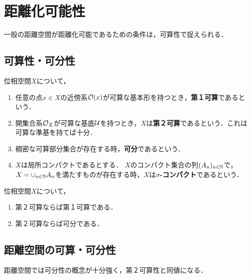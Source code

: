 \documentclass[uplatex,dvipdfmx]{jsreport}
\begin{document}
\section{距離化可能性}

\begin{tcolorbox}[colframe=ForestGreen, colback=ForestGreen!10!white,breakable,colbacktitle=ForestGreen!40!white,coltitle=black,fonttitle=\bfseries\sffamily,
title=]
    一般の距離空間が距離化可能であるための条件は，可算性で捉えられる．
\end{tcolorbox}

\subsection{可算性・可分性}

\begin{definition}
    位相空間$X$について，
    \begin{enumerate}
        \item 任意の点$x\in X$の近傍系$\mathcal{O}(x)$が可算な基本形を持つとき，\textbf{第１可算}であるという．
        \item 開集合系$\mathcal{O}_X$が可算な基底$\mathcal{U}$を持つとき，$X$は\textbf{第２可算}であるという．これは可算な準基を持てば十分．
        \item 稠密な可算部分集合が存在する時，\textbf{可分}であるという．
        \item $X$は局所コンパクトであるとする．
        $X$のコンパクト集合の列$(A_n)_{n\in\mathbb{N}}$で，$X=\cup_{n\in\mathbb{N}}A_n$を満たすものが存在する時，$X$は\textbf{$\sigma$-コンパクト}であるという．
    \end{enumerate}
\end{definition}

\begin{proposition}
    位相空間$X$について，
    \begin{enumerate}
        \item 第２可算ならば第１可算である．
        \item 第２可算ならば可分である．
    \end{enumerate}
\end{proposition}

\subsection{距離空間の可算・可分性}

\begin{tcolorbox}[colframe=ForestGreen, colback=ForestGreen!10!white,breakable,colbacktitle=ForestGreen!40!white,coltitle=black,fonttitle=\bfseries\sffamily,
title=]
    距離空間では可分性の概念が十分強く，第２可算性と同値になる．
\end{tcolorbox}
\end{document}
